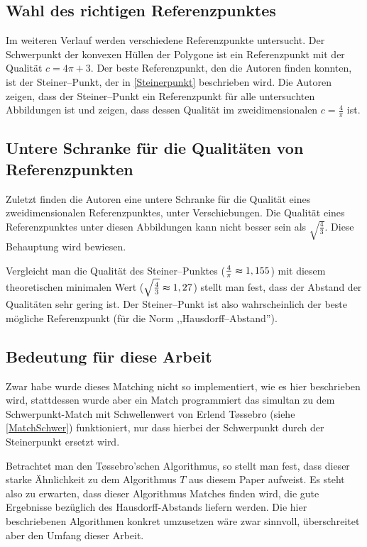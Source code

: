 \subsection{Wahl des richtigen Referenzpunktes}

Im weiteren Verlauf werden verschiedene Referenzpunkte untersucht. Der Schwerpunkt der konvexen Hüllen der Polygone ist ein Referenzpunkt mit der Qualität $c=4\pi+3$. Der beste Referenzpunkt, den die Autoren finden konnten, ist der Steiner--Punkt, der in \vref{Steinerpunkt} beschrieben wird. Die Autoren zeigen, dass der Steiner--Punkt ein Referenzpunkt für alle untersuchten Abbildungen ist und zeigen, dass dessen Qualität im zweidimensionalen $c=\frac{4}{\pi}$ ist. 

\subsection{Untere Schranke für die Qualitäten von Referenzpunkten}

Zuletzt finden die Autoren eine untere Schranke für die Qualität eines zweidimensionalen Referenzpunktes, unter Verschiebungen. Die Qualität eines Referenzpunktes unter diesen Abbildungen kann nicht besser sein als $\sqrt{\frac{4}{3}}$. Diese Behauptung wird bewiesen. 

Vergleicht man die Qualität des Steiner--Punktes ($\frac{4}{\pi}\thickapprox 1,155$) mit diesem theoretischen minimalen Wert ($\sqrt{\frac{4}{3}}\thickapprox 1,27$) stellt man fest, dass der Abstand der Qualitäten sehr gering ist. Der Steiner--Punkt ist also wahrscheinlich der beste mögliche Referenzpunkt (für die Norm ,,Hausdorff--Abstand'').

\subsection{Bedeutung für diese Arbeit}\label{BedeutungAAR}

Zwar habe wurde dieses Matching nicht so implementiert, wie es hier beschrieben wird, stattdessen wurde aber ein Match programmiert das simultan zu dem Schwerpunkt-Match mit Schwellenwert von Erlend T\o{}ssebro (siehe \vref{MatchSchwer}) funktioniert, nur dass hierbei der Schwerpunkt durch der Steinerpunkt ersetzt wird.

Betrachtet man den T\o{}ssebro'schen Algorithmus, so stellt man fest, dass dieser starke Ähnlichkeit zu dem Algorithmus $T$ aus diesem Paper aufweist. Es steht also zu erwarten, dass dieser Algorithmus Matches finden wird, die gute Ergebnisse bezüglich des Hausdorff-Abstands liefern werden. Die hier beschriebenen Algorithmen konkret umzusetzen wäre zwar sinnvoll, überschreitet aber den Umfang dieser Arbeit.

